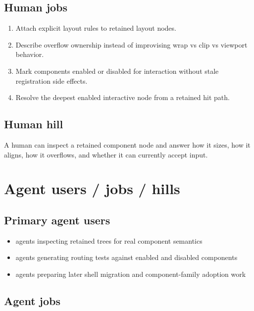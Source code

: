\subsection{Human jobs}\label{record-154-human-jobs}

\begin{enumerate}
\def\labelenumi{\arabic{enumi}.}
\tightlist
\item
  Attach explicit layout rules to retained layout nodes.
\item
  Describe overflow ownership instead of improvising wrap vs clip vs viewport behavior.
\item
  Mark components enabled or disabled for interaction without stale registration side effects.
\item
  Resolve the deepest enabled interactive node from a retained hit path.
\end{enumerate}

\subsection{Human hill}\label{record-154-human-hill}

A human can inspect a retained component node and answer how it sizes, how it aligns, how it overflows, and whether it can currently accept input.

\section{Agent users / jobs / hills}\label{record-154-agent-users-jobs-hills}

\subsection{Primary agent users}\label{record-154-primary-agent-users}

\begin{itemize}
\tightlist
\item
  agents inspecting retained trees for real component semantics
\item
  agents generating routing tests against enabled and disabled components
\item
  agents preparing later shell migration and component-family adoption work
\end{itemize}

\subsection{Agent jobs}\label{record-154-agent-jobs}

